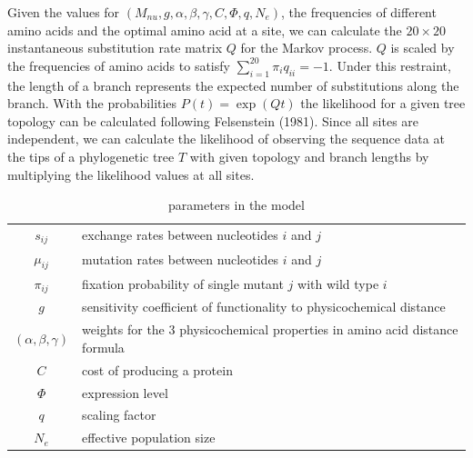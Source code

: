 \documentclass[13pt]{article}
\begin{document}
Given the values for $(M_{nu},g, \alpha, \beta, \gamma, C, \Phi, q, N_e)$, the frequencies of different amino acids and the optimal amino acid at a site, we can calculate the $20 \times 20$ instantaneous substitution rate matrix $Q$ for the Markov process. $Q$ is scaled by the frequencies of amino acids to satisfy $\sum_{i=1}^{20} \pi_i q_{ii}= -1$. Under this restraint, the length of a branch represents the expected number of substitutions along the branch. With the probabilities $P(t)  = \exp(Qt)$ the likelihood for a given tree topology can be calculated following Felsenstein (1981). Since all sites are independent, we can calculate the likelihood of observing the sequence data at the tips of a phylogenetic tree $T$ with given topology and branch lengths by multiplying the likelihood values at all sites.\\

\begin{table}[h]
\centering
\caption{parameters in the model}
\begin{tabular}{ c p{10cm} }
\hline
$s_{ij}$ & exchange rates between nucleotides $i$ and $j$ \\
$\mu_{ij}$ & mutation rates between nucleotides $i$ and $j$\\
$\pi_{ij}$ & fixation probability of single mutant $j$ with wild type $i$\\
$g$       & sensitivity coefficient of functionality to physicochemical distance \\
$(\alpha,\beta,\gamma)$ & weights for the 3 physicochemical properties in amino acid distance formula \\
$C$ & cost of producing a protein\\
$\Phi$ & expression level \\
$q$ & scaling factor \\
$N_e$ & effective population size \\
\hline
\end{tabular}

\label{tb: para}
\end{table}
\end{document}
